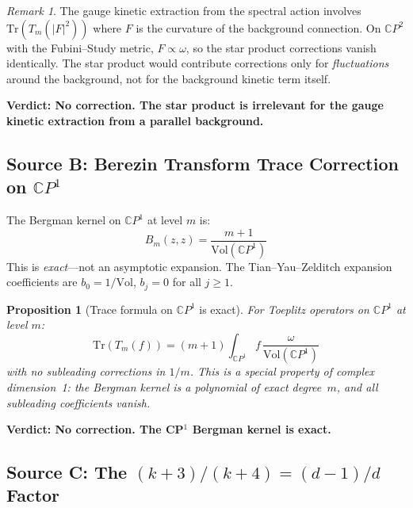 \documentclass[12pt,a4paper]{article}
\newtheorem{proposition}{Proposition}
\theoremstyle{definition}
\theoremstyle{remark}
\newtheorem{remark}{Remark}
\newcommand{\CP}{\mathbb{C}P}
\newcommand{\Tr}{\mathrm{Tr}}
\begin{document}
\begin{remark}
The gauge kinetic extraction from the spectral action involves
$\Tr(T_m(|F|^2))$ where $F$ is the curvature of the background connection.
On $\CP^2$ with the Fubini--Study metric, $F \propto \omega$, so the star
product corrections vanish identically. The star product would contribute
corrections only for \emph{fluctuations} around the background, not for the
background kinetic term itself.
\end{remark}

\textbf{Verdict: No correction. The star product is irrelevant for the gauge kinetic extraction from a parallel background.}

\subsection{Source B: Berezin Transform Trace Correction on $\CP^1$}
\label{sec:sourceB}

The Bergman kernel on $\CP^1$ at level $m$ is:
\begin{equation}
B_m(z, z) = \frac{m + 1}{\mathrm{Vol}(\CP^1)}
\end{equation}
This is \emph{exact}---not an asymptotic expansion. The Tian--Yau--Zelditch
expansion coefficients are $b_0 = 1/\mathrm{Vol}$, $b_j = 0$ for all $j \geq 1$.

\begin{proposition}[Trace formula on $\CP^1$ is exact]
For Toeplitz operators on $\CP^1$ at level $m$:
\begin{equation}
\Tr(T_m(f)) = (m+1) \int_{\CP^1} f\,\frac{\omega}{\mathrm{Vol}(\CP^1)}
\end{equation}
with \emph{no} subleading corrections in $1/m$. This is a special property
of complex dimension~1: the Bergman kernel is a polynomial of exact degree~$m$,
and all subleading coefficients vanish.
\end{proposition}

\textbf{Verdict: No correction. The CP$^1$ Bergman kernel is exact.}

\subsection{Source C: The $(k+3)/(k+4) = (d{-}1)/d$ Factor}
\label{sec:sourceC}
\end{document}
